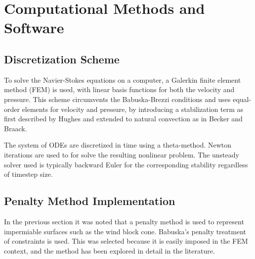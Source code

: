 \section{Computational Methods and Software}
\label{sec:software}


\subsection{Discretization Scheme}

To solve the Navier-Stokes equations on a computer, a
Galerkin finite element method (FEM) is used, with linear basis
functions for both the velocity and pressure. This scheme circumvents
the Babuska-Brezzi conditions\cite{bb-cond} and 
uses equal-order elements for velocity and 
pressure,  by introducing a stabilization term as first described by
Hughes\cite{Hughes198685} and extended to natural convection as in
Becker and Braack\cite{Becker2002428}.  

The system of ODEs are discretized in time using a theta-method. 
Newton iterations are used to for solve the resulting nonlinear problem. 
The unsteady solver used is typically backward Euler for the
corresponding stability regardless of timestep size. 

\subsection{Penalty Method Implementation}

In the previous section it was noted that a penalty method is used to
represent impermiable surfaces such as the wind block cone. Babuska's
penalty treatment of constraints\cite{1973fempen,ZAMM:ZAMM19880680925}
is used. This was selected because it is easily imposed in the FEM
context, and the method has been explored in detail in the literature. 


